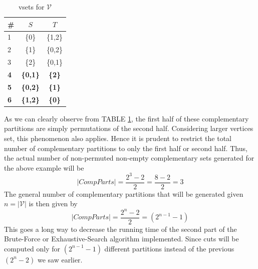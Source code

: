 \documentclass[longpaper, english, final, times]{revdetua}
\begin{document}
			\begin{table}[!h]
				\caption{vsets for $\mathcal{V}$}
				\label{table:VSetsExample1}
				\begin{center}
					\begin{tabular}{lcc}
						\toprule
						\# & $S$ & $T$ \\
						\midrule
						1 & \{0\} & \{1,2\} \\
						2 & \{1\} & \{0,2\} \\
						3 & \{2\} & \{0,1\} \\
						\hdashline
						\textbf{4} & \textbf{\{0,1\}} & \textbf{\{2\}} \\
						\textbf{5} & \textbf{\{0,2\}} & \textbf{\{1\}} \\
						\textbf{6} & \textbf{\{1,2\}} & \textbf{\{0\}} \\
						\bottomrule
					\end{tabular}
				\end{center}
			\end{table}		
			
			As we can clearly observe from TABLE \ref{table:VSetsExample1}, the first half of these complementary partitions are simply permutations of the second half. Considering larger vertices set, this phenomenon also applies. Hence it is prudent to restrict the total number of complementary partitions to only the first half or second half. Thus, the actual number of non-permuted non-empty complementary sets generated for the above example will be $$|CompParts|=\frac{2^3-2}{2}=\frac{8-2}{2}=3$$
			The general number of complementary partitions that will be generated given $n=|\mathcal{V}|$ is then given by $$|CompParts|=\frac{2^n-2}{2}=(2^{n-1}-1)$$
			This goes a long way to decrease the running time of the second part of the Brute-Force or Exhaustive-Search algorithm implemented. Since cuts will be computed only for $(2^{n-1}-1)$ different partitions instead of the previous $(2^{n}-2)$ we saw earlier.
	
\end{document}
